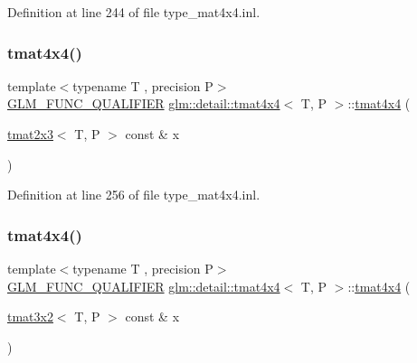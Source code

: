 Definition at line 244 of file type\+\_\+mat4x4.\+inl.

\mbox{\label{structglm_1_1detail_1_1tmat4x4_a1bbfdeafdcea2b96b4742c2e79c75032}} 
\subsubsection{\texorpdfstring{tmat4x4()}{tmat4x4()}\hspace{0.1cm}{\footnotesize\ttfamily [13/22]}}
{\footnotesize\ttfamily template$<$typename T , precision P$>$ \\
\hyperlink{setup_8hpp_a33fdea6f91c5f834105f7415e2a64407}{G\+L\+M\+\_\+\+F\+U\+N\+C\+\_\+\+Q\+U\+A\+L\+I\+F\+I\+ER} \hyperlink{structglm_1_1detail_1_1tmat4x4}{glm\+::detail\+::tmat4x4}$<$ T, P $>$\+::\hyperlink{structglm_1_1detail_1_1tmat4x4}{tmat4x4} (\begin{DoxyParamCaption}\item[{\hyperlink{structglm_1_1detail_1_1tmat2x3}{tmat2x3}$<$ T, P $>$ const \&}]{x }\end{DoxyParamCaption})\hspace{0.3cm}{\ttfamily [explicit]}}



Definition at line 256 of file type\+\_\+mat4x4.\+inl.

\mbox{\label{structglm_1_1detail_1_1tmat4x4_adb8ba041dc8fcf747e5d8a9a99e7f9e1}} 
\subsubsection{\texorpdfstring{tmat4x4()}{tmat4x4()}\hspace{0.1cm}{\footnotesize\ttfamily [14/22]}}
{\footnotesize\ttfamily template$<$typename T , precision P$>$ \\
\hyperlink{setup_8hpp_a33fdea6f91c5f834105f7415e2a64407}{G\+L\+M\+\_\+\+F\+U\+N\+C\+\_\+\+Q\+U\+A\+L\+I\+F\+I\+ER} \hyperlink{structglm_1_1detail_1_1tmat4x4}{glm\+::detail\+::tmat4x4}$<$ T, P $>$\+::\hyperlink{structglm_1_1detail_1_1tmat4x4}{tmat4x4} (\begin{DoxyParamCaption}\item[{\hyperlink{structglm_1_1detail_1_1tmat3x2}{tmat3x2}$<$ T, P $>$ const \&}]{x }\end{DoxyParamCaption})\hspace{0.3cm}{\ttfamily [explicit]}}



